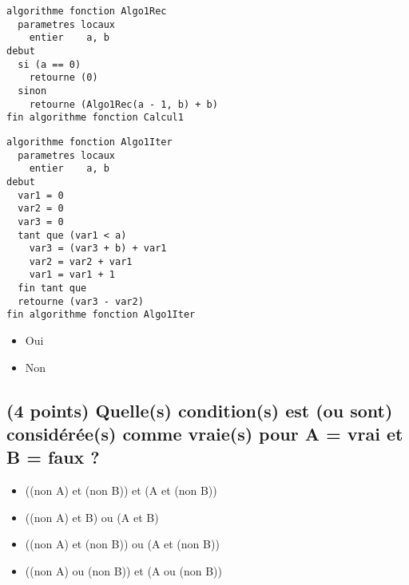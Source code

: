 \documentclass[11pt,a4paper]{article}
\begin{document}
\begin{table}[ht!]
  \centering
  \begin{minipage}{0.5\textwidth}
    \centering
  \begin{lstlisting}[style=algorithmique]
algorithme fonction Algo1Rec
  parametres locaux
    entier    a, b
debut
  si (a == 0)
    retourne (0)
  sinon
    retourne (Algo1Rec(a - 1, b) + b)
fin algorithme fonction Calcul1 \end{lstlisting}
  \end{minipage}
  \hfillx
  \begin{minipage}{0.5\textwidth}
    \centering
  \begin{lstlisting}[style=algorithmique]
algorithme fonction Algo1Iter
  parametres locaux
    entier    a, b
debut
  var1 = 0
  var2 = 0
  var3 = 0
  tant que (var1 < a)
    var3 = (var3 + b) + var1
    var2 = var2 + var1
    var1 = var1 + 1
  fin tant que
  retourne (var3 - var2)
fin algorithme fonction Algo1Iter \end{lstlisting}
  \end{minipage}
\end{table}

\smallskip

\begin{itemize}
  \item[\checkmark] Oui \\ %
  \item[\CaseCoche] Non \\
\end{itemize}


\bigskip


\subsection{(4 points) Quelle(s) condition(s) est (ou sont) considérée(s) comme vraie(s) pour A = vrai et B = faux ? }

\begin{itemize}
  \item[\CaseCoche] ((non A) et (non B)) et (A et (non B)) \\ %
  \item[\CaseCoche] ((non A) et    B)    ou (A et    B)    \\ %
  \item[\checkmark] ((non A) et (non B)) ou (A et (non B)) \\ %
  \item[\checkmark] ((non A) ou (non B)) et (A ou (non B)) \\ %
\end{itemize}
\end{document}
